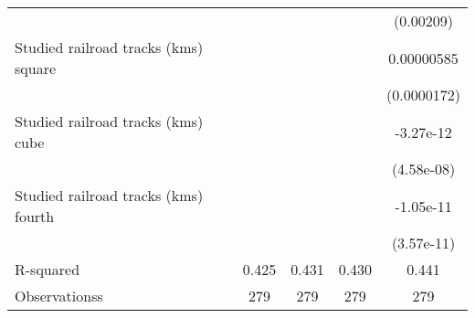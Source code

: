 {\begin{tabular}{l*{4}{c}}
                    &                     &                     &                     &   (0.00209)         \\
[1em]
Studied railroad tracks (kms) square&                     &                     &                     &  0.00000585         \\
                    &                     &                     &                     & (0.0000172)         \\
[1em]
Studied railroad tracks (kms) cube&                     &                     &                     &   -3.27e-12         \\
                    &                     &                     &                     &  (4.58e-08)         \\
[1em]
Studied railroad tracks (kms) fourth&                     &                     &                     &   -1.05e-11         \\
                    &                     &                     &                     &  (3.57e-11)         \\
\hline
R-squared           &       0.425         &       0.431         &       0.430         &       0.441         \\
Observationss       &         279         &         279         &         279         &         279         \\
\hline\hline
\end{tabular}
}

